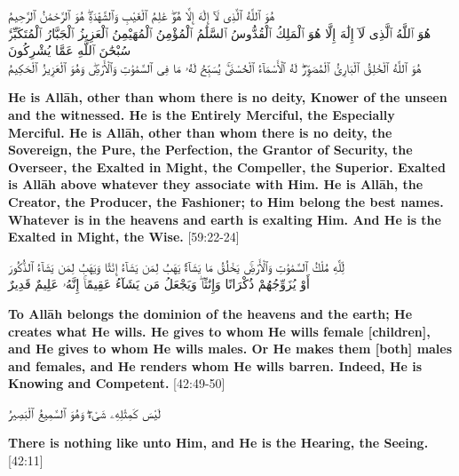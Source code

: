 \begin{center}
    \begin{RLtext}
        هُوَ ٱللَّهُ ٱلَّذِى لَآ إِلَٰهَ إِلَّا هُوَۖ عَٰلِمُ ٱلْغَيْبِ وَٱلشَّهَٰدَةِۖ هُوَ    ٱلرَّحْمَٰنُ ٱلرَّحِيمُ \\
        هُوَ ٱللَّهُ ٱلَّذِى لَآ إِلَٰهَ إِلَّا هُوَ ٱلْمَلِكُ ٱلْقُدُّوسُ ٱلسَّلَٰمُ ٱلْمُؤْمِنُ    ٱلْمُهَيْمِنُ ٱلْعَزِيزُ ٱلْجَبَّارُ ٱلْمُتَكَبِّرُۚ سُبْحَٰنَ ٱللَّهِ عَمَّا يُشْرِكُونَ \\
        هُوَ ٱللَّهُ ٱلْخَٰلِقُ ٱلْبَارِئُ ٱلْمُصَوِّرُۖ لَهُ ٱلْأَسْمَآءُ ٱلْحُسْنَىٰۚ يُسَبِّحُ لَهُۥ مَا فِى ٱلسَّمَٰوَٰتِ وَٱلْأَرْضِۖ وَهُوَ ٱلْعَزِيزُ ٱلْحَكِيمُ 
    \end{RLtext}
\end{center}
\textbf{He is Allāh, other than whom there is no deity, Knower of the unseen and the witnessed. He is the Entirely Merciful, the Especially Merciful. He is Allāh, other than whom there is no deity, the Sovereign, the Pure, the Perfection, the Grantor of Security, the Overseer, the Exalted in Might, the Compeller, the Superior. Exalted is Allāh above whatever they associate with Him. He is Allāh, the Creator, the Producer, the Fashioner; to Him belong the best names. Whatever is in the heavens and earth is exalting Him. And He is the Exalted in Might, the Wise.} [59:22-24]

\begin{center}
    \begin{RLtext}
        لِّلَّهِ مُلْكُ ٱلسَّمَٰوَٰتِ وَٱلْأَرْضِۚ يَخْلُقُ مَا يَشَآءُۚ يَهَبُ لِمَن يَشَآءُ إِنَٰثًا وَيَهَبُ لِمَن يَشَآءُ ٱلذُّكُورَ \\
        أَوْ يُزَوِّجُهُمْ ذُكْرَانًا وَإِنَٰثًاۖ وَيَجْعَلُ مَن يَشَآءُ عَقِيمًاۚ إِنَّهُۥ عَلِيمٌ قَدِيرٌ 
    \end{RLtext}
\end{center}
\textbf{To Allāh belongs the dominion of the heavens and the earth; He creates what He wills. He gives to whom He wills female [children], and He gives to whom He wills males. Or He makes them [both] males and females, and He renders whom He wills barren. Indeed, He is Knowing and Competent.} [42:49-50]

\begin{center}
    \begin{RLtext}
        لَيْسَ كَمِثْلِهِۦ شَىْءٌۖ وَهُوَ ٱلسَّمِيعُ ٱلْبَصِيرُ 
    \end{RLtext}
    \textbf{There is nothing like unto Him, and He is the Hearing, the Seeing.} [42:11]
\end{center}